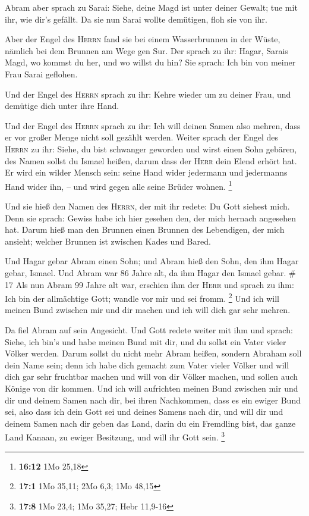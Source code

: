  Abram aber sprach zu Sarai: Siehe, deine Magd ist unter
deiner Gewalt; tue mit ihr, wie dir's gefällt. Da sie nun Sarai wollte
demütigen, floh sie von ihr.

 Aber der Engel des \textsc{Herrn} fand sie bei einem
Wasserbrunnen in der Wüste, nämlich bei dem Brunnen am Wege gen Sur.
 Der sprach zu ihr: Hagar, Sarais Magd, wo kommst du her,
und wo willst du hin? Sie sprach: Ich bin von meiner Frau Sarai
geflohen.

 Und der Engel des \textsc{Herrn} sprach zu ihr: Kehre
wieder um zu deiner Frau, und demütige dich unter ihre Hand.

 Und der Engel des \textsc{Herrn} sprach zu ihr: Ich will
deinen Samen also mehren, dass er vor großer Menge nicht soll gezählt
werden.  Weiter sprach der Engel des \textsc{Herrn} zu
ihr: Siehe, du bist schwanger geworden und wirst einen Sohn gebären, des
Namen sollst du Ismael heißen, darum dass der \textsc{Herr} dein Elend
erhört hat.  Er wird ein wilder Mensch sein: seine Hand
wider jedermann und jedermanns Hand wider ihn, -- und wird gegen alle
seine Brüder wohnen. \footnote{\textbf{16:12} 1Mo 25,18}

 Und sie hieß den Namen des \textsc{Herrn}, der mit ihr
redete: Du Gott siehest mich. Denn sie sprach: Gewiss habe ich hier
gesehen den, der mich hernach angesehen hat.  Darum hieß
man den Brunnen einen Brunnen des Lebendigen, der mich ansieht; welcher
Brunnen ist zwischen Kades und Bared.

 Und Hagar gebar Abram einen Sohn; und Abram hieß den
Sohn, den ihm Hagar gebar, Ismael.  Und Abram war 86
Jahre alt, da ihm Hagar den Ismael gebar. \# 17  Als nun
Abram 99 Jahre alt war, erschien ihm der \textsc{Herr} und sprach zu
ihm: Ich bin der allmächtige Gott; wandle vor mir und sei fromm.
\footnote{\textbf{17:1} 1Mo 35,11; 2Mo 6,3; 1Mo 48,15} 
Und ich will meinen Bund zwischen mir und dir machen und ich will dich
gar sehr mehren.

 Da fiel Abram auf sein Angesicht. Und Gott redete weiter
mit ihm und sprach:  Siehe, ich bin's und habe meinen Bund
mit dir, und du sollst ein Vater vieler Völker werden. 
Darum sollst du nicht mehr Abram heißen, sondern Abraham soll dein Name
sein; denn ich habe dich gemacht zum Vater vieler Völker 
und will dich gar sehr fruchtbar machen und will von dir Völker machen,
und sollen auch Könige von dir kommen.  Und ich will
aufrichten meinen Bund zwischen mir und dir und deinem Samen nach dir,
bei ihren Nachkommen, dass es ein ewiger Bund sei, also dass ich dein
Gott sei und deines Samens nach dir,  und will dir und
deinem Samen nach dir geben das Land, darin du ein Fremdling bist, das
ganze Land Kanaan, zu ewiger Besitzung, und will ihr Gott sein.
\footnote{\textbf{17:8} 1Mo 23,4; 1Mo 35,27; Hebr 11,9-16}

